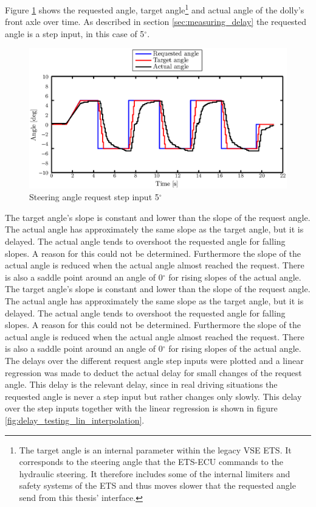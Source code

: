 \documentclass[ExampleMasters.tex]{subfiles}
\begin{document}
Figure \ref{fig:step_input} shows the requested angle, target angle\footnote{The target angle is an internal parameter within the legacy \gls{VSE} \gls{ETS}. It corresponds to the steering angle that the \gls{ETS}-\gls{ECU} commands to the hydraulic steering. It therefore includes some of the internal limiters and safety systems of the \gls{ETS} and thus moves slower that the requested angle send from this thesis' interface.} and actual angle of the dolly's front axle over time. As described in section \ref{sec:measuring_delay} the requested angle is a step input, in this case of 5$^\circ$.\\
\begin{figure}[!hbt]
	\centering
	\includegraphics[width=1\linewidth]{figures/lifted_front_5deg}
	\caption{Steering angle request step input 5$^{\circ}$}
	
	\label{fig:step_input}
\end{figure}
The target angle's slope is constant and lower than the slope of the request angle. The actual angle has approximately the same slope as the target angle, but it is delayed. The actual angle tends to overshoot the requested angle for falling slopes. A reason for this could not be determined. Furthermore the slope of the actual angle is reduced when the actual angle almost reached the request. There is also a saddle point around an angle of 0$^{\circ}$ for rising slopes of the actual angle.          
The target angle's slope is constant and lower than the slope of the request angle. The actual angle has approximately the same slope as the target angle, but it is delayed. The actual angle tends to overshoot the requested angle for falling slopes. A reason for this could not be determined. Furthermore the slope of the actual angle is reduced when the actual angle almost reached the request. There is also a saddle point around an angle of 0$^{\circ}$ for rising slopes of the actual angle.          
The delays over the different request angle step inputs were plotted and a linear regression was made to deduct the actual delay for small changes of the request angle. This delay is the relevant delay, since in real driving situations the requested angle is never a step input but rather changes only slowly. This delay over the step inputs together with the linear regression is shown in figure \ref{fig:delay_testing_lin_interpolation}.    
\end{document}
